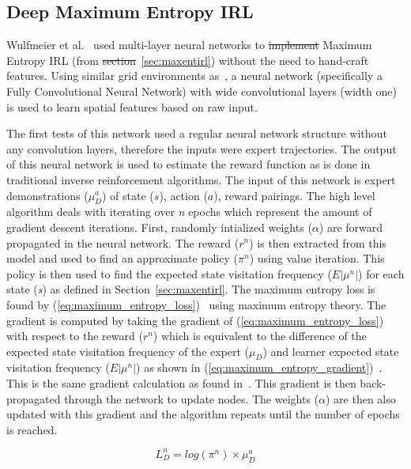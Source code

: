 \documentclass[12pt,american]{report}
\providecommand{\DIFaddtex}[1]{{\protect\color{blue}\uwave{#1}}} %
\providecommand{\DIFdeltex}[1]{{\protect\color{red}\sout{#1}}}                      %
\providecommand{\DIFaddbegin}{} %
\providecommand{\DIFaddend}{} %
\providecommand{\DIFdelbegin}{} %
\providecommand{\DIFdelend}{} %
\providecommand{\DIFadd}[1]{\texorpdfstring{\DIFaddtex{#1}}{#1}} %
\providecommand{\DIFdel}[1]{\texorpdfstring{\DIFdeltex{#1}}{}} %
\newcommand{\DIFscaledelfig}{0.5}
\newlength{\DIFdelgraphicswidth} %
\newlength{\DIFdelgraphicsheight} %
\newcommand{\DIFaddincludegraphics}[2][]{{\color{blue}\fbox{\DIFOincludegraphics[#1]{#2}}}} %
\newcommand{\DIFdelincludegraphics}[2][]{%
\sbox{\DIFdelgraphicsbox}{\DIFOincludegraphics[#1]{#2}}%
\settoboxwidth{\DIFdelgraphicswidth}{\DIFdelgraphicsbox} %
\settoboxtotalheight{\DIFdelgraphicsheight}{\DIFdelgraphicsbox} %
\scalebox{\DIFscaledelfig}{%
\parbox[b]{\DIFdelgraphicswidth}{\usebox{\DIFdelgraphicsbox}\\[-\baselineskip] \rule{\DIFdelgraphicswidth}{0em}}\llap{\resizebox{\DIFdelgraphicswidth}{\DIFdelgraphicsheight}{%
\setlength{\unitlength}{\DIFdelgraphicswidth}%
\begin{picture}(1,1)%
\thicklines\linethickness{2pt} %
{\color[rgb]{1,0,0}\put(0,0){\framebox(1,1){}}}%
{\color[rgb]{1,0,0}\put(0,0){\line( 1,1){1}}}%
{\color[rgb]{1,0,0}\put(0,1){\line(1,-1){1}}}%
\end{picture}%
}\hspace*{3pt}}} %
} %
\DeclareRobustCommand{\DIFaddbegin}{\DIFOaddbegin \let\includegraphics\DIFaddincludegraphics} %
\DeclareRobustCommand{\DIFaddend}{\DIFOaddend \let\includegraphics\DIFOincludegraphics} %
\DeclareRobustCommand{\DIFdelbegin}{\DIFOdelbegin \let\includegraphics\DIFdelincludegraphics} %
\DeclareRobustCommand{\DIFdelend}{\DIFOaddend \let\includegraphics\DIFOincludegraphics} %
\begin{document}
\label{sec:maxentdeepirl}
\subsection{Deep Maximum Entropy IRL}
Wulfmeier et al.~\cite{wulfmeier2015maximum} used multi-layer neural networks to \DIFdelbegin \DIFdel{implement }\DIFdelend \DIFaddbegin \DIFadd{use }\DIFaddend Maximum Entropy IRL (from \DIFdelbegin \DIFdel{section}\DIFdelend \DIFaddbegin \DIFadd{Section}\DIFaddend ~\ref{sec:maxentirl}) without the need to hand-craft features. Using similar grid environments as~\cite{ziebart2008maximum}, a neural network (specifically a Fully Convolutional Neural Network) with wide convolutional layers (width one) is used to learn spatial features based on raw input.  

The first tests of this network used a regular neural network structure without any convolution layers, therefore the inputs were expert trajectories. The output of this neural network is used to estimate the reward function as is done in traditional inverse reinforcement algorithms. The input of this network is expert demonstrations ($\mu_{D}^{a}$) of state ($s$), action ($a$), reward pairings. The high level algorithm deals with iterating over \textit{n} epochs which represent the amount of gradient descent iterations. First, randomly intialized weights ($\alpha$) are forward propagated in the neural network.  The reward ($r^n$) is then extracted from this model and used to find an approximate policy ($\pi^n$) using value iteration. This policy is then used to find the expected state visitation frequency ($E|\mu^n|$) for each state (\textit{s}) as defined in Section~\ref{sec:maxentirl}.  The maximum entropy loss is found by (\ref{eq:maximum_entropy_loss})~\cite{wulfmeier2015maximum} using maximum entropy theory. The gradient is computed by taking the gradient of (\ref{eq:maximum_entropy_loss}) with respect to the reward ($r^n$) which is equivalent to the difference of the expected state visitation frequency of the expert ($\mu_D$) and learner expected state visitation frequency ($E|\mu^n|$) as shown in (\ref{eq:maximum_entropy_gradient})~\cite{wulfmeier2015maximum}.  This is the same gradient calculation as found in~\cite{ziebart2008maximum}.  This gradient is then back-propagated through the network to update nodes.  The weights ($\alpha$) are then also updated with this gradient and the algorithm repeats until the number of epochs is reached. 

\begin{equation}
            \label{eq:maximum_entropy_loss}
            L_{D}^{n}=log(\pi^n) \times \mu_{D}^{a}%
        \end{equation}
\end{document}
